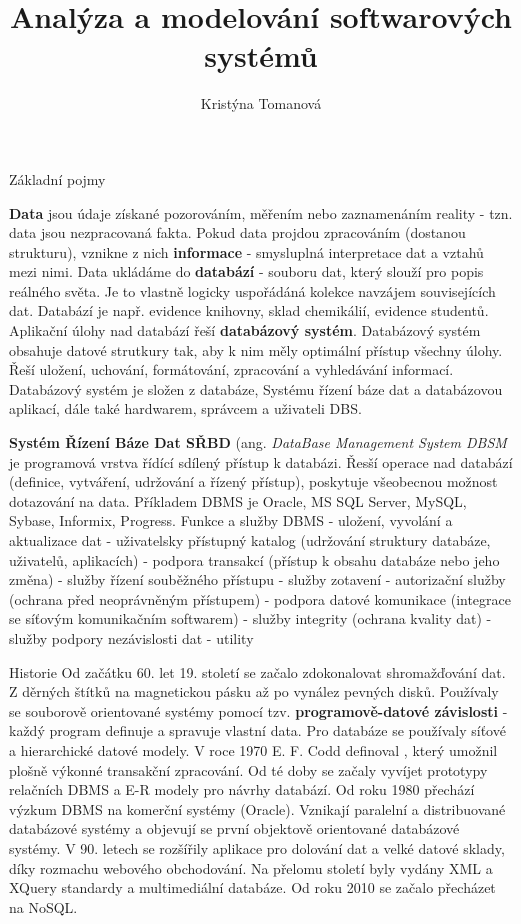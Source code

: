 \documentclass[11pt,a4paper]{book}   %
\author{Kristýna Tomanová}
\title{Analýza a modelování softwarových systémů}
\begin{document}
Základní pojmy

\textbf{Data} jsou údaje získané pozorováním, měřením nebo zaznamenáním reality - tzn. data jsou nezpracovaná fakta.
Pokud data projdou zpracováním (dostanou strukturu), vznikne z nich \textbf{informace} - smysluplná interpretace dat a vztahů mezi nimi.
Data ukládáme do \textbf{databází} - souboru dat, který slouží pro popis reálného světa. Je to vlastně logicky uspořádáná kolekce navzájem souvisejících dat. Databází je např. evidence knihovny, sklad chemikálií, evidence studentů. 
Aplikační úlohy nad databází řeší \textbf{databázový systém}. Databázový systém obsahuje datové strutkury tak, aby k nim měly optimální přístup všechny úlohy. Řeší uložení, uchování, formátování, zpracování a vyhledávání informací. Databázový systém je složen z databáze, Systému řízení báze dat a databázovou aplikací, dále také hardwarem, správcem a uživateli DBS.

\textbf{Systém Řízení Báze Dat SŘBD} (ang. \textit{DataBase Management System DBSM} je programová vrstva řídící sdílený přístup k databázi. Řesší operace nad databází (definice, vytváření, udržování a řízený přístup), poskytuje všeobecnou možnost dotazování na data. Příkladem DBMS je Oracle, MS SQL Server, MySQL, Sybase, Informix, Progress.
Funkce a služby DBMS
- uložení, vyvolání a aktualizace dat
- uživatelsky přístupný katalog (udržování struktury databáze, uživatelů, aplikacích)
- podpora transakcí (přístup k obsahu databáze nebo jeho změna)
- služby řízení souběžného přístupu
- služby zotavení
- autorizační služby (ochrana před neoprávněným přístupem)
- podpora datové komunikace (integrace se síťovým komunikačním softwarem)
- služby integrity (ochrana kvality dat)
- služby podpory nezávislosti dat
- utility


Historie
Od začátku 60. let 19. století se začalo zdokonalovat shromažďování dat. Z děrných štítků na magnetickou pásku až po vynález pevných disků. Používaly se souborově orientované systémy pomocí tzv. \textbf{programově-datové závislosti} - každý program definuje a spravuje vlastní data. Pro databáze se používaly síťové a hierarchické datové modely.
V roce 1970 E. F. Codd definoval , který umožnil plošně výkonné transakční zpracování. Od té doby se začaly vyvíjet prototypy relačních DBMS a E-R modely pro návrhy databází.
Od roku 1980 přechází výzkum DBMS na komerční systémy (Oracle). Vznikají paralelní a distribuované databázové systémy a objevují se první objektově orientované databázové systémy.
V 90. letech se rozšířily aplikace pro dolování dat a velké datové sklady, díky rozmachu webového obchodování.
Na přelomu století byly vydány XML a XQuery standardy a multimediální databáze. Od roku 2010 se začalo přecházet na NoSQL.
\end{document}
